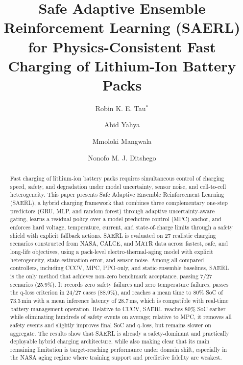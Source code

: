 \documentclass[%
 aip,
 amsmath,amssymb,
reprint, onecolumn %
]{revtex4-1}
\begin{document}

\title[Safe Adaptive Ensemble Reinforcement Learning (SAERL)]{Safe Adaptive Ensemble Reinforcement Learning (SAERL)\\for Physics-Consistent Fast Charging of Lithium-Ion Battery Packs}

\author{Robin K. E. Tau$^{*}$}
\author{Abid Yahya}%
 

 \author{Mmoloki Mangwala}


\author{Nonofo M. J. Ditshego}
 


\begin{abstract}
Fast charging of lithium-ion battery packs requires simultaneous control of charging speed, safety, and degradation under model uncertainty, sensor noise, and cell-to-cell heterogeneity. This paper presents Safe Adaptive Ensemble Reinforcement Learning (SAERL), a hybrid charging framework that combines three complementary one-step predictors (GRU, MLP, and random forest) through adaptive uncertainty-aware gating, learns a residual policy over a model predictive control (MPC) anchor, and enforces hard voltage, temperature, current, and state-of-charge limits through a safety shield with explicit fallback actions. SAERL is evaluated on 27 realistic charging scenarios constructed from NASA, CALCE, and MATR data across fastest, safe, and long-life objectives, using a pack-level electro-thermal-aging model with explicit heterogeneity, state-estimation error, and sensor noise. Among all compared controllers, including CCCV, MPC, PPO-only, and static-ensemble baselines, SAERL is the only method that achieves non-zero benchmark acceptance, passing 7/27 scenarios (25.9\%). It records zero safety failures and zero temperature failures, passes the q-loss criterion in 24/27 cases (88.9\%), and reaches a mean time to 80\% SoC of 73.3\,min with a mean inference latency of 28.7\,ms, which is compatible with real-time battery-management operation. Relative to CCCV, SAERL reaches 80\% SoC earlier while eliminating hundreds of safety events on average; relative to MPC, it removes all safety events and slightly improves final SoC and q-loss, but remains slower on aggregate. The results show that SAERL is already a safety-dominant and practically deployable hybrid charging architecture, while also making clear that its main remaining limitation is target-reaching performance under domain shift, especially in the NASA aging regime where training support and predictive fidelity are weakest.

 
\end{abstract}
\end{document}
